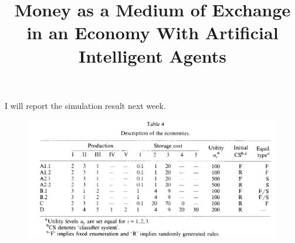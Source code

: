 \documentclass[mathserif]{beamer}
\title{ Money as a Medium of Exchange in an Economy
With Artificial Intelligent Agents}
\begin{document}
    \begin{frame}
        \maketitle
    \end{frame}

    
    
    

    \begin{frame}[plain]
    
        \begin{center}
            I will report the simulation result next week.
        \end{center}
        \begin{figure}
            \includegraphics[width=\textwidth]{img/table4_simulation_result.jpg}
        \end{figure}
    \end{frame}
\end{document}
